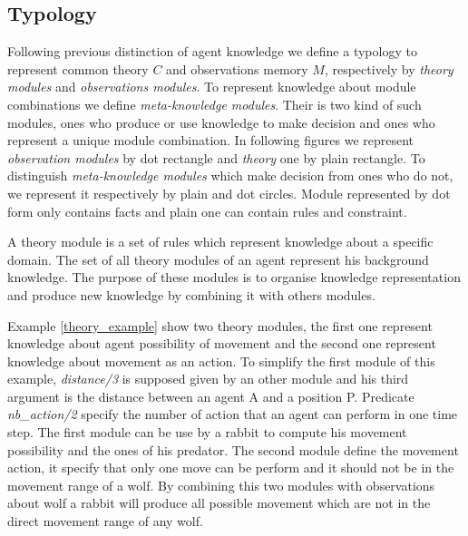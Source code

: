 \documentclass{aamas2012}
\begin{document}
\subsection{Typology}

	Following previous distinction of agent knowledge we define a typology to represent common theory $C$ and observations memory $M$,
	respectively by \emph{theory modules} and \emph{observations modules}.
	To represent knowledge about module combinations we define \emph{meta-knowledge modules}.
	Their is two kind of such modules, ones who produce or use knowledge to make decision and ones who represent a unique module combination.
	In following figures we represent  \emph{observation modules} by dot rectangle and  \emph{theory} one by plain rectangle.
	To distinguish \emph{meta-knowledge modules} which make decision from ones who do not, we represent it respectively by plain and dot circles.
	Module represented by dot form only contains facts and plain one can contain rules and constraint.

	\begin{definition}
		A theory module is a set of rules which represent knowledge about a specific domain.
		The set of all theory modules of an agent represent his background knowledge.
		The purpose of these modules is to organise knowledge representation and produce
		new knowledge by combining it with others modules.
	\end{definition}
	
	Example \ref{theory_example} show two theory modules, the first one represent knowledge about agent possibility of movement and 
	the second one represent knowledge about movement as an action.
	To simplify the first module of this example, \textit{distance/3} is supposed given by an other module and 
	his third argument is the distance between an agent A and a position P.
	Predicate \textit{nb\_action/2} specify the number of action that an agent can perform in one time step.
	The first module can be use by a rabbit to compute his movement possibility and the ones of his predator.
	The second module define the movement action, it specify that only one move can be perform and it should not be in the movement range of a wolf.
	By combining this two modules with observations about wolf a rabbit will produce all possible movement which are not in the direct movement range of any wolf.
	
\end{document}
